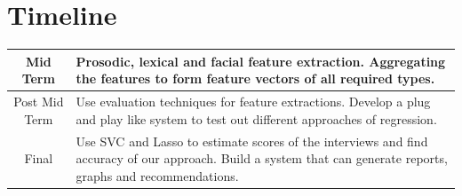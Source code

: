 \documentclass[11pt]{article}
\begin{document}
\section{Timeline}
\begin{table}[h!]
    \begin{tabular}{ | c | p{13cm} | }
	\hline
        Mid Term & Prosodic, lexical and facial feature extraction. \newline Aggregating the features to form feature vectors of all required types. \newline \\
	\hline
        Post Mid Term &  Use evaluation techniques for feature extractions. \newline Develop a plug and play like system to test out different approaches of regression.\newline \\ 
        \hline
        Final & Use SVC and Lasso to estimate scores of the interviews and find accuracy of our approach. \newline Build a system that can generate reports, graphs and recommendations.\newline \\ 
        \hline
    \end{tabular} 
\end{table}



\end{document}
